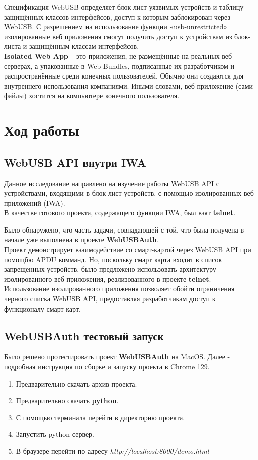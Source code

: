 \documentclass[12pt]{article}
\begin{document}
Спецификация WebUSB определяет блок-лист уязвимых устройств и таблицу защищённых классов интерфейсов, доступ к которым заблокирован через WebUSB. С разрешением на использование функции «usb-unrestricted» изолированные веб приложения смогут получить доступ к устройствам из блок-листа и защищённым классам интерфейсов. \\
\textbf{Isolated Web App} -- это приложения, не размещённые на реальных веб-серверах, а упакованные в Web Bundles, подписанные их разработчиком и распространённые среди конечных пользователей. Обычно они создаются для внутреннего использования компаниями. 
Иными словами, веб приложение (сами файлы) хостится на компьютере конечного пользователя.\\

\section{Ход работы}
\subsection{WebUSB API внутри IWA}
Данное исследование направлено на изучение работы WebUSB API с устройствами, входящими в блок-лист устройств, с помощью изолированных веб приложений (IWA). \\
В качестве готового проекта, содержащего функции IWA, был взят \href{https://github.com/GoogleChromeLabs/telnet-client}{\textbf{telnet}}. 

Было обнаружено, что часть задачи, совпадающей с той, что была получена в начале уже выполнена в проекте \href{https://github.com/jbirkholz/webusbAuth}{\textbf{WebUSBAuth}}. \\
Проект демонстрирует взаимодействие со смарт-картой через WebUSB API при помощбю APDU комманд. Но, поскольку смарт карта входит в список запрещенных устройств, было предложено использовать архитектуру изолированного веб-приложения, реализованного в проекте \textbf{telnet}. 
Использование изолированного приложения позволяет обойти ограничения черного списка WebUSB API, предоставляя разработчикам доступ к функционалу смарт-карт. 

\subsection{WebUSBAuth тестовый запуск}
Было решено протестировать проект \textbf{WebUSBAuth} на MacOS. Далее - подробная инструкция по сборке и запуску проекта в Chrome 129. 
\begin{enumerate}
    \item Предварительно скачать архив проекта. 
    \item Предварительно скачать \href{https://www.python.org/downloads/macos/}{\textbf{python}}. 
    \item С помощью терминала перейти в директорию проекта. 
    \item Запустить python сервер. 
    \item В браузере перейти по адресу \emph{http://localhost:8000/demo.html}
\end{enumerate} 
\end{document}
